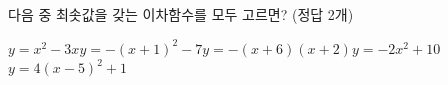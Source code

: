 \hspace*{2mm}\begin{minipage}[t]{\dimexpr\linewidth-2mm\relax}\vspace{0pt}
다음 중 최솟값을 갖는 이차함수를 모두 고르면? (정답 2개)
\begin{choicesii}{$y=x^2-3x$}{$y=-(x+1)^2-7$}{$y=-(x+6)(x+2)$}{$y=-2x^2+10$}{$y=4(x-5)^2+1$}\end{choicesii}\end{minipage}
